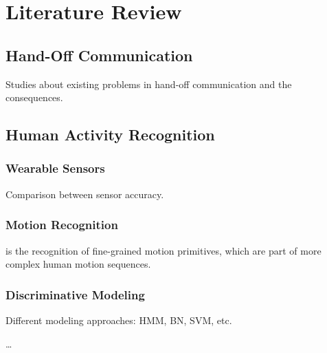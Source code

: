 
\chapter{Literature Review}
\label{ch:Literature-Review}

\section{Hand-Off Communication}
\label{sec:Literature-Review:Hand-Off Communication}
Studies about existing problems in hand-off communication and the consequences.

\section{Human Activity Recognition}
\label{sec:Literature-Review:Human-Activity-Recognition}

\subsection{Wearable Sensors}
Comparison between sensor accuracy.

\subsection{Motion Recognition}
is the recognition of fine-grained motion primitives, which are part of more complex human motion sequences.

\subsection{Discriminative Modeling}
Different modeling approaches: HMM, BN, SVM, etc.

\dots